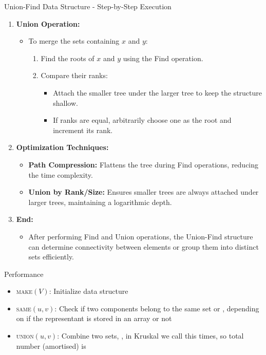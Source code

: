 \begin{usage}[]{Union-Find Data Structure - Step-by-Step Execution}
\begin{enumerate}
        \item \textbf{Union Operation:}
              \begin{itemize}
                  \item To merge the sets containing \(x\) and \(y\):
                        \begin{enumerate}
                            \item Find the roots of \(x\) and \(y\) using the Find operation.
                            \item Compare their ranks:
                                  \begin{itemize}
                                      \item Attach the smaller tree under the larger tree to keep the structure shallow.
                                      \item If ranks are equal, arbitrarily choose one as the root and increment its rank.
                                  \end{itemize}
                        \end{enumerate}
              \end{itemize}

        \item \textbf{Optimization Techniques:}
              \begin{itemize}
                  \item \textbf{Path Compression:} Flattens the tree during Find operations, reducing the time complexity.
                  \item \textbf{Union by Rank/Size:} Ensures smaller trees are always attached under larger trees, maintaining a logarithmic depth.
              \end{itemize}

        \item \textbf{End:}
              \begin{itemize}
                  \item After performing Find and Union operations, the Union-Find structure can determine connectivity between elements or group them into distinct sets efficiently.
              \end{itemize}
    \end{enumerate}
\end{usage}

\begin{properties}[]{Performance}
    \begin{itemize}
        \item \textsc{make}$(V)$: Initialize data structure 
        \item \textsc{same}$(u, v)$: Check if two components belong to the same set  or , depending on if the representant is stored in an array or not
        \item \textsc{union}$(u, v)$: Combine two sets, , in Kruskal we call this  times, so total number (amortised) is 
    \end{itemize}
\end{properties}
